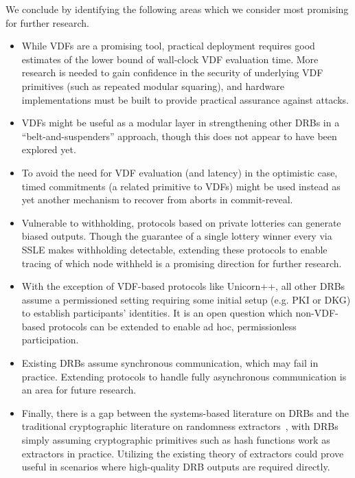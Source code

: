 We conclude by identifying the following areas which we consider most promising for further research.
\begin{itemize}
    \item While VDFs are a promising tool, practical deployment requires good estimates of the lower bound of wall-clock VDF evaluation time. More research is needed to gain confidence in the security of underlying VDF primitives (such as repeated modular squaring), and hardware implementations must be built to provide practical assurance against attacks.
    \item VDFs might be useful as a modular layer in strengthening other DRBs in a ``belt-and-suspenders'' approach, though this does not appear to have been explored yet.
    \item To avoid the need for VDF evaluation (and latency) in the optimistic case, timed commitments (a related primitive to VDFs) might be used instead as yet another mechanism to recover from aborts in commit-reveal.
    \item Vulnerable to withholding, protocols based on private lotteries can generate biased outputs. Though the guarantee of a single lottery winner every \epoch via SSLE makes withholding detectable, extending these protocols to enable tracing of which node withheld is a promising direction for further research.
    \item With the exception of VDF-based protocols like Unicorn++, all other DRBs assume a permissioned setting requiring some initial setup (e.g. PKI or DKG) to establish participants' identities. It is an open question which non-VDF-based protocols can be extended to enable ad hoc, permissionless participation.
    \item Existing DRBs assume synchronous communication, which may fail in practice. Extending protocols to handle fully asynchronous communication is an area for future research.
    \item Finally, there is a gap between the systems-based literature on DRBs and the traditional cryptographic literature on randomness extractors~\cite{trevisan2000extracting,trevisan2001extractors}, with DRBs simply assuming cryptographic primitives such as hash functions work as extractors in practice. Utilizing the existing theory of extractors could prove useful in scenarios where high-quality DRB outputs are required directly.
\end{itemize}